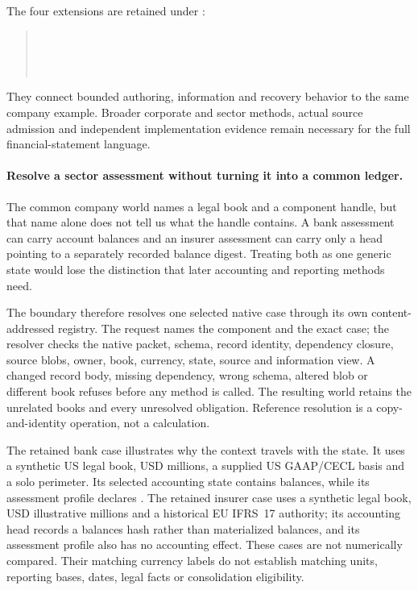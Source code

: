 The four extensions are retained under :
\begin{quote}\small
{}\\
\\
\\
\end{quote}
They connect bounded authoring, information and recovery behavior to the same
company example. Broader corporate and
sector methods, actual source admission and independent implementation
evidence remain necessary for the full financial-statement language.

\paragraph{Resolve a sector assessment without turning it into a common ledger.}
The common company world names a legal book and a component handle, but that
name alone does not tell us what the handle contains. A bank assessment can
carry account balances and an insurer assessment can carry only a head pointing
to a separately recorded balance digest. Treating both as one generic state
would lose the distinction that later accounting and reporting methods need.

The boundary therefore resolves one selected native case through its own
content-addressed registry. The request names the component and the exact case;
the resolver checks the native packet, schema, record identity, dependency
closure, source blobs, owner, book, currency, state, source and information
view. A changed record body, missing dependency, wrong schema, altered blob or
different book refuses before any method is called. The resulting world retains
the unrelated books and every unresolved obligation. Reference resolution is a
copy-and-identity operation, not a calculation.

The retained bank case illustrates why the context travels with the state. It
uses a synthetic US legal book, USD millions, a supplied US GAAP/CECL basis and
a solo perimeter. Its selected accounting state contains balances, while its
assessment profile declares . The retained insurer
case uses a synthetic legal book, USD illustrative millions and a historical
EU IFRS~17 authority; its accounting head records a balances hash rather than
materialized balances, and its assessment profile also has no accounting
effect. These cases are not numerically compared. Their matching currency
labels do not establish matching units, reporting bases, dates, legal facts or
consolidation eligibility.

